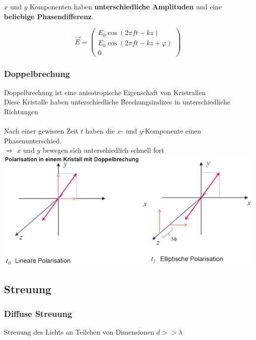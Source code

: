 $x$ und $y$ Komponenten haben \textbf{unterschiedliche Amplituden} und eine \textbf{beliebige Phasendifferenz}.

$$ \boxed{  \vec{E} = \begin{pmatrix} E_0 \cos(2 \pi ft-kz) \\ E_0 \cos(2 \pi ft -kz + \varphi) \\ 0 \end{pmatrix}  } $$





\subsubsection{Doppelbrechung}

Doppelbrechung ist eine anisotropische Eigenschaft von Kristrallen \\
Diese Kristalle haben unterschiedliche Brechungsindizes in unterschiedliche Richtungen \\
\\
Nach einer gewissen Zeit $t$ haben die $x$- und $y$-Komponente einen Phasenunterschied. \\
$\Rightarrow$ $x$ und $y$ bewegen sich unterschiedlich schnell fort \\

\includegraphics[width=0.8\linewidth]{Bilder/Wellen-Optik/kristall_mit_doppelbrechung}






\subsection{Streuung}

\subsubsection{Diffuse Streuung}

Streuung des Lichts an Teilchen von Dimensionen $d >> \lambda$ \\ 

